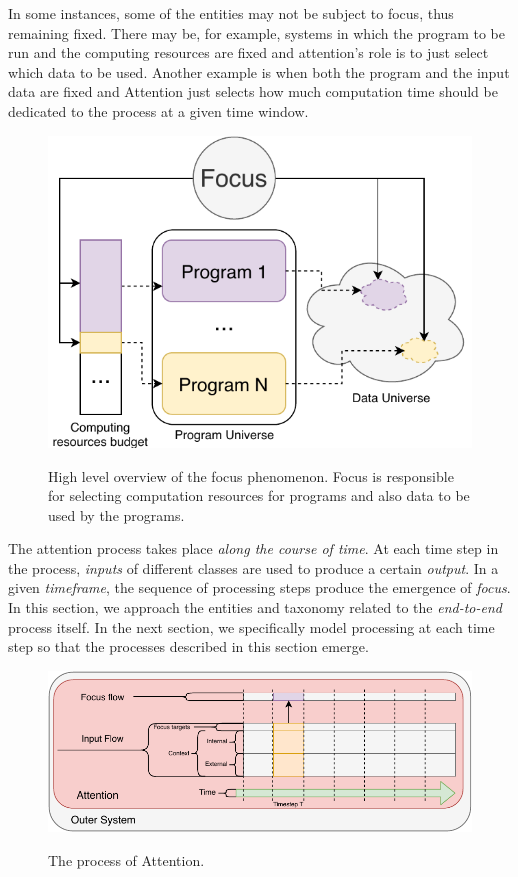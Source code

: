 \documentclass[11pt]{article}
\begin{document}
In some instances, some of the entities may not be subject to focus, thus remaining fixed.
There may be, for example, systems in which the program to be run and the computing resources are fixed and attention's role
is to just select which data to be used.
Another example is when both the program and the input data are fixed and Attention just selects how much computation time
should be dedicated to the process at a given time window.

\begin{figure}[H]
    \centering
    \includegraphics[width=0.7\linewidth]{./img/mind.pdf}\label{fig:mind}
    \caption{High level overview of the focus phenomenon. Focus is responsible for selecting computation resources for programs and also data to be used by the programs.}
\end{figure}

The attention process takes place \emph{along the course of time}.
At each time step in the process, \emph{inputs} of different classes are used to produce a certain \emph{output}.
In a given \emph{timeframe}, the sequence of processing steps produce the emergence of \emph{focus}.
In this section, we approach the entities and taxonomy related to the \emph{end-to-end} process itself.
In the next section, we specifically model processing at each time step so that the processes described in this section emerge.

\begin{figure}[H]
    \centering
    \includegraphics[width=1.0\linewidth]{./img/att_flow.pdf}\label{fig:attflow}
    \caption{The process of Attention.}
\end{figure}
\end{document}
